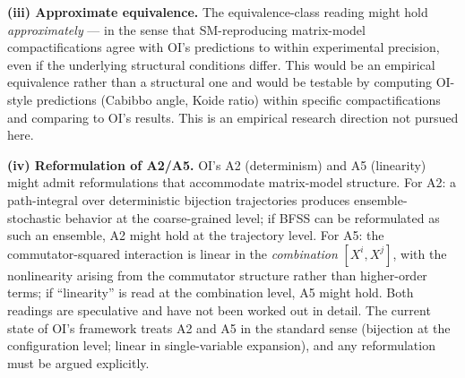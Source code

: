 \documentclass[
]{article}
\begin{document}
\textbf{(iii) Approximate equivalence.} The equivalence-class reading
might hold \emph{approximately} --- in the sense that SM-reproducing
matrix-model compactifications agree with OI's predictions to within
experimental precision, even if the underlying structural conditions
differ. This would be an empirical equivalence rather than a structural
one and would be testable by computing OI-style predictions (Cabibbo
angle, Koide ratio) within specific compactifications and comparing to
OI's results. This is an empirical research direction not pursued here.

\textbf{(iv) Reformulation of A2/A5.} OI's A2 (determinism) and A5
(linearity) might admit reformulations that accommodate matrix-model
structure. For A2: a path-integral over deterministic bijection
trajectories produces ensemble-stochastic behavior at the coarse-grained
level; if BFSS can be reformulated as such an ensemble, A2 might hold at
the trajectory level. For A5: the commutator-squared interaction is
linear in the \emph{combination} \([X^i, X^j]\), with the nonlinearity
arising from the commutator structure rather than higher-order terms; if
``linearity'' is read at the combination level, A5 might hold. Both
readings are speculative and have not been worked out in detail. The
current state of OI's framework treats A2 and A5 in the standard sense
(bijection at the configuration level; linear in single-variable
expansion), and any reformulation must be argued explicitly.
\end{document}
